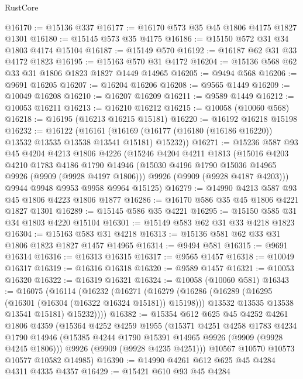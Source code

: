 \begin{lexlean}{RustCore}
\begin{coremodule}
@16170 := @15136 @337
@16177 := @16170 @573 @35 @45 @1806 @4175 @1827 @1301
@16180 := @15145 @573 @35 @4175
@16186 := @15150 @572 @31 @34 @1803 @4174 @15104
@16187 := @15149 @570
@16192 := @16187 @62 @31 @33 @4172 @1823
@16195 := @15163 @570 @31 @4172
@16204 := @15136 @568 @62 @33 @31 @1806 @1823 @1827 @1449 @14965
@16205 := @9494 @568
@16206 := @9691 @16205
@16207 := @16204 @16206
@16208 := @9565 @1449
@16209 := @10049 @16208
@16210 := @16207 @16209
@16211 := @9589 @1449
@16212 := @10053 @16211
@16213 := @16210 @16212
@16215 := @10058 (@10060 @568)
@16218 := @16195 (@16213 @16215 @15181)
@16220 := @16192 @16218 @15198
@16232 := @16122
    (@16161 (@16169 (@16177 (@16180 (@16186 @16220)) @13532 @13535 @13538 @13541 @15181) @15232))
@16271 := @15236
    @587
    @93
    @45
    @4204
    @4213
    @1806
    @4226
    (@15246
      @4204
      @4211
      @1813
      (@15016
        @4203
        @4210
        @1783
        @4186
        @1790
        @14946
        (@15030 @4196 @1790 @15036 @14965 @9926 (@9909 (@9928 @4197 @1806)))
        @9926
        (@9909 (@9928 @4187 @4203)))
      @9944
      @9948
      @9953
      @9958
      @9964
      @15125)
@16279 := @14990 @4213 @587 @93 @45 @1806 @4223 @1806 @1877
@16286 := @16170 @586 @35 @45 @1806 @4221 @1827 @1301
@16289 := @15145 @586 @35 @4221
@16295 := @15150 @585 @31 @34 @1803 @4220 @15104
@16301 := @15149 @583 @62 @31 @33 @4218 @1823
@16304 := @15163 @583 @31 @4218
@16313 := @15136 @581 @62 @33 @31 @1806 @1823 @1827 @1457 @14965
@16314 := @9494 @581
@16315 := @9691 @16314
@16316 := @16313 @16315
@16317 := @9565 @1457
@16318 := @10049 @16317
@16319 := @16316 @16318
@16320 := @9589 @1457
@16321 := @10053 @16320
@16322 := @16319 @16321
@16324 := @10058 (@10060 @581)
@16343 := @16075
    (@16114
      (@16232
        (@16271
          (@16279
            (@16286
              (@16289 (@16295 (@16301 (@16304 (@16322 @16324 @15181)) @15198)))
              @13532
              @13535
              @13538
              @13541
              @15181)
            @15232))))
@16382 := @15354
    @612
    @625
    @45
    @4252
    @4261
    @1806
    @4359
    (@15364
      @4252
      @4259
      @1955
      (@15371
        @4251
        @4258
        @1783
        @4234
        @1790
        @14946
        (@15385 @4244 @1790 @15391 @14965 @9926 (@9909 (@9928 @4245 @1806)))
        @9926
        (@9909 (@9928 @4235 @4251)))
      @10567
      @10570
      @10573
      @10577
      @10582
      @14985)
@16390 := @14990 @4261 @612 @625 @45 @4284 @4311 @4335 @4357
@16429 := @15421
    @610
    @93
    @45
    @4284

\end{coremodule}
\end{lexlean}
